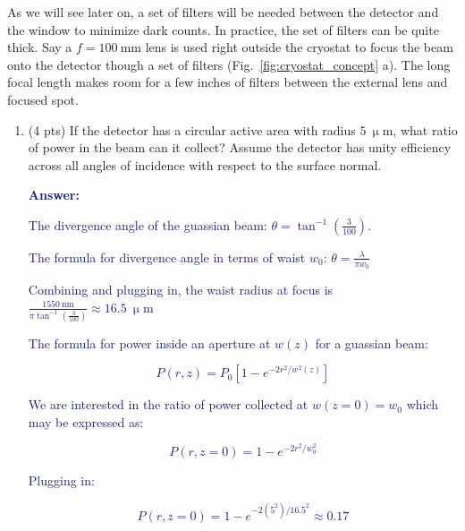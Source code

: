\documentclass[11pt]{caltech_thesis} %
\begin{document}
As we will see later on, a set of filters will be needed between the
detector and the window to minimize dark counts. In practice, the set of
filters can be quite thick. Say a \(f = 100~\mathrm{mm}\) lens is used
right outside the cryostat to focus the beam onto the detector though a
set of filters (Fig.~\ref{fig:cryostat_concept} a). The long focal
length makes room for a few inches of filters between the external lens
and focused spot.

\begin{enumerate}
\def\labelenumi{\arabic{enumi}.}
\item
  (4 pts) If the detector has a circular active area with radius
  \(5~\mathrm{\upmu m}\), what ratio of power in the beam can it
  collect? Assume the detector has unity efficiency across all angles of
  incidence with respect to the surface normal.

  \textcolor{midnightblue}{

  \textbf{Answer:}

  }

  \textcolor{midnightblue}{

  The divergence angle of the guassian beam:
  \(\theta = \tan^{-1}({\frac{3}{100}})\).

  }

  \textcolor{midnightblue}{ The formula for divergence angle in terms of
  waist \(w_0\): \(\theta = \frac{\lambda}{\pi w_0}\) }

  \textcolor{midnightblue}{ Combining and plugging in, the waist radius
  at focus is
  \(\frac{1550~\mathrm{nm}}{\pi \tan^{-1}(\frac{3}{100})} \approx 16.5~ \mathrm{\upmu m}\)
  }

  \textcolor{midnightblue}{ The formula for power inside an aperture at
  \(w(z)\) for a guassian beam:}

  \textcolor{midnightblue}{

  \[P(r, z)=P_{0}\left[1-e^{-2 r^{2} / w^{2}(z)}\right]\]

  }

  \textcolor{midnightblue}{We are interested in the ratio of power
  collected at \(w(z=0) = w_0\) which may be expressed as:}

  \textcolor{midnightblue}{

  \[P(r, z=0)=1-e^{-2 r^{2} / w_0^{2}}\]

  }

  \textcolor{midnightblue}{Plugging in: }

  \textcolor{midnightblue}{

  \[P(r, z=0)=1-e^{-2(5^{2}) / 16.5^{2}} \approx  \boxed{0.17} \]

}
\end{enumerate}
\end{document}
